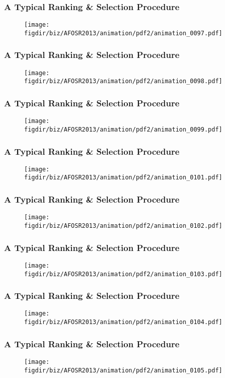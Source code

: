 \documentclass[13pt]{beamer}
\newcommand{\figdir}{../../fig}
\begin{document}
{\begin{frame}\frametitle{A Typical Ranking \& Selection Procedure}\begin{figure}\texttt{[image: \\figdir/biz/AFOSR2013/animation/pdf2/animation\_0097.pdf]}\end{figure}\end{frame}
\begin{frame}\frametitle{A Typical Ranking \& Selection Procedure}\begin{figure}\texttt{[image: \\figdir/biz/AFOSR2013/animation/pdf2/animation\_0098.pdf]}\end{figure}\end{frame}
\begin{frame}\frametitle{A Typical Ranking \& Selection Procedure}\begin{figure}\texttt{[image: \\figdir/biz/AFOSR2013/animation/pdf2/animation\_0099.pdf]}\end{figure}\end{frame}
\begin{frame}\frametitle{A Typical Ranking \& Selection Procedure}\begin{figure}\texttt{[image: \\figdir/biz/AFOSR2013/animation/pdf2/animation\_0101.pdf]}\end{figure}\end{frame}
\begin{frame}\frametitle{A Typical Ranking \& Selection Procedure}\begin{figure}\texttt{[image: \\figdir/biz/AFOSR2013/animation/pdf2/animation\_0102.pdf]}\end{figure}\end{frame}
\begin{frame}\frametitle{A Typical Ranking \& Selection Procedure}\begin{figure}\texttt{[image: \\figdir/biz/AFOSR2013/animation/pdf2/animation\_0103.pdf]}\end{figure}\end{frame}
\begin{frame}\frametitle{A Typical Ranking \& Selection Procedure}\begin{figure}\texttt{[image: \\figdir/biz/AFOSR2013/animation/pdf2/animation\_0104.pdf]}\end{figure}\end{frame}
\begin{frame}\frametitle{A Typical Ranking \& Selection Procedure}\begin{figure}\texttt{[image: \\figdir/biz/AFOSR2013/animation/pdf2/animation\_0105.pdf]}\end{figure}\end{frame}
}
\end{document}
